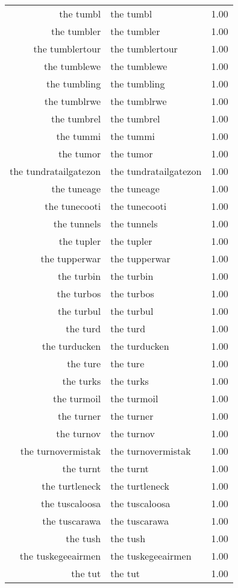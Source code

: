 \begin{table}[ht]
\begin{tabular}{rlr}
  the tumbl & the tumbl & 1.00 \\ 
  the tumbler & the tumbler & 1.00 \\ 
  the tumblertour & the tumblertour & 1.00 \\ 
  the tumblewe & the tumblewe & 1.00 \\ 
  the tumbling & the tumbling & 1.00 \\ 
  the tumblrwe & the tumblrwe & 1.00 \\ 
  the tumbrel & the tumbrel & 1.00 \\ 
  the tummi & the tummi & 1.00 \\ 
  the tumor & the tumor & 1.00 \\ 
  the tundratailgatezon & the tundratailgatezon & 1.00 \\ 
  the tuneage & the tuneage & 1.00 \\ 
  the tunecooti & the tunecooti & 1.00 \\ 
  the tunnels & the tunnels & 1.00 \\ 
  the tupler & the tupler & 1.00 \\ 
  the tupperwar & the tupperwar & 1.00 \\ 
  the turbin & the turbin & 1.00 \\ 
  the turbos & the turbos & 1.00 \\ 
  the turbul & the turbul & 1.00 \\ 
  the turd & the turd & 1.00 \\ 
  the turducken & the turducken & 1.00 \\ 
  the ture & the ture & 1.00 \\ 
  the turks & the turks & 1.00 \\ 
  the turmoil & the turmoil & 1.00 \\ 
  the turner & the turner & 1.00 \\ 
  the turnov & the turnov & 1.00 \\ 
  the turnovermistak & the turnovermistak & 1.00 \\ 
  the turnt & the turnt & 1.00 \\ 
  the turtleneck & the turtleneck & 1.00 \\ 
  the tuscaloosa & the tuscaloosa & 1.00 \\ 
  the tuscarawa & the tuscarawa & 1.00 \\ 
  the tush & the tush & 1.00 \\ 
  the tuskegeeairmen & the tuskegeeairmen & 1.00 \\ 
  the tut & the tut & 1.00 \\ 

\end{tabular}
\end{table}
